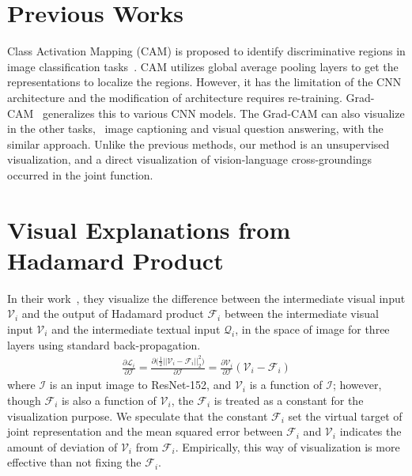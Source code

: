 \documentclass{article}
\begin{document}
\section{Previous Works}

Class Activation Mapping (CAM) is proposed to identify discriminative regions in image classification tasks~\cite{Zhou2016}. CAM utilizes global average pooling layers to get the representations to localize the regions. However, it has the limitation of the CNN architecture and the modification of architecture requires re-training. Grad-CAM~\cite{Selvaraju2016} generalizes this to various CNN models. The Grad-CAM can also visualize in the other tasks, \eg~image captioning and visual question answering, with the similar approach. Unlike the previous methods, our method is an unsupervised visualization, and a direct visualization of vision-language cross-groundings occurred in the joint function.

\section{Visual Explanations from Hadamard Product}

In their work~\cite{Kim2016b}, they visualize the difference between the intermediate visual input $\mathcal{V}_i$ and the output of Hadamard product $\mathcal{F}_i$ between the intermediate visual input $\mathcal{V}_i$ and the intermediate textual input $\mathcal{Q}_i$, in the space of image for three layers using standard back-propagation. \begin{gather}
  \frac{\partial{\mathcal{L}_{i}}}{\partial{\mathcal{I}}} = 
    \frac{\partial{  \big( \frac{1}{2}||\mathcal{V}_i-\mathcal{F}_i||_2^2 \big)  }}{\partial{\mathcal{I}}} = 
    \frac{\partial{\mathcal{V}_i}}{\partial{\mathcal{I}}}(\mathcal{V}_i-\mathcal{F}_i)
\end{gather}
where $\mathcal{I}$ is an input image to ResNet-152, and $\mathcal{V}_i$ is a function of $\mathcal{I}$; however, though $\mathcal{F}_i$ is also a function of $\mathcal{V}_i$, the $\mathcal{F}_i$ is treated as a constant for the visualization purpose. 
We speculate that the constant $\mathcal{F}_i$ set the virtual target of joint representation and the mean squared error between $\mathcal{F}_i$ and $\mathcal{V}_i$ indicates the amount of deviation of $\mathcal{V}_i$ from $\mathcal{F}_i$. 
Empirically, this way of visualization is more effective than not fixing the $\mathcal{F}_i$.
\end{document}
